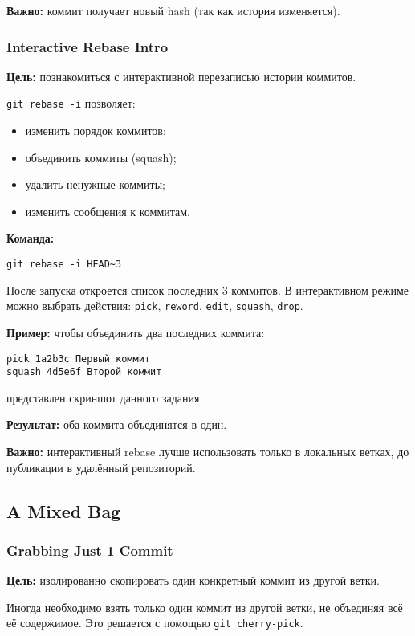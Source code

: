 \documentclass[a4paper,12pt]{report}
\begin{document}
\textbf{Важно:} коммит получает новый hash (так как история изменяется).

\subsubsection{Interactive Rebase Intro}
\textbf{Цель:} познакомиться с интерактивной перезаписью истории коммитов.

\texttt{git rebase -i} позволяет:
\begin{itemize}[noitemsep]
    \item изменить порядок коммитов;
    \item объединить коммиты (squash);
    \item удалить ненужные коммиты;
    \item изменить сообщения к коммитам.
\end{itemize}

\textbf{Команда:}
\begin{verbatim}
git rebase -i HEAD~3
\end{verbatim}

После запуска откроется список последних 3 коммитов. В интерактивном режиме можно выбрать действия: \texttt{pick}, \texttt{reword}, \texttt{edit}, \texttt{squash}, \texttt{drop}.

\textbf{Пример:} чтобы объединить два последних коммита:
\begin{verbatim}
pick 1a2b3c Первый коммит
squash 4d5e6f Второй коммит
\end{verbatim}

 представлен скриншот данного задания.

\textbf{Результат:} оба коммита объединятся в один.

\textbf{Важно:} интерактивный rebase лучше использовать только в локальных ветках, до публикации в удалённый репозиторий.

\subsection{A Mixed Bag}

\subsubsection{Grabbing Just 1 Commit}
\textbf{Цель:} изолированно скопировать один конкретный коммит из другой ветки.

Иногда необходимо взять только один коммит из другой ветки, не объединяя всё её содержимое. Это решается с помощью \texttt{git cherry-pick}.
\end{document}
